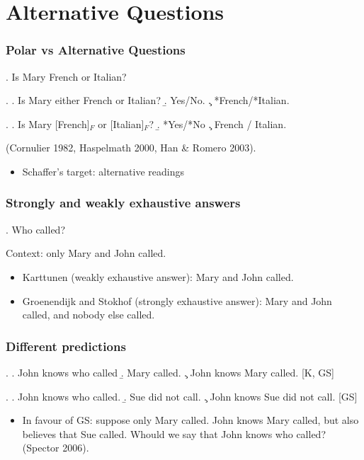 \section{Alternative Questions}

\begin{frame}

\frametitle{Polar vs Alternative Questions}

\ex. Is Mary French or Italian?\pause

\ex. \a. Is Mary either French or Italian? \b. Yes/No. \c.
*French/*Italian.\pause

\ex. \a. Is Mary [French]$_F$ or [Italian]$_F$? \b. *Yes/*No \c.
French / Italian.

(Cornulier 1982, Haspelmath 2000, Han \& Romero 2003).

\begin{itemize}\pause

\item Schaffer's target: alternative readings

\end{itemize}


\end{frame}


\begin{frame}

\frametitle{Strongly and weakly exhaustive answers}

\ex. Who called?

Context: only Mary and John called.

\begin{itemize}

\item \alert{Karttunen} (weakly exhaustive answer): Mary and John called.

\item \alert{Groenendijk and Stokhof} (strongly exhaustive answer): Mary and
John called, and nobody else called.

\end{itemize}

\end{frame}


\begin{frame}

\frametitle{Different predictions}

\ex. \a. John knows who called \b. Mary called. \c. John knows
Mary called. [K, GS]\pause

\ex. \a. John knows who called. \b. Sue did not call. \c. John
knows Sue did not call. [GS]

\begin{itemize}\pause

\item In favour of GS: suppose only Mary called. John
knows Mary called, but also believes that Sue called. Whould we
say that John knows who called? (Spector 2006).


\end{itemize}

\end{frame}

